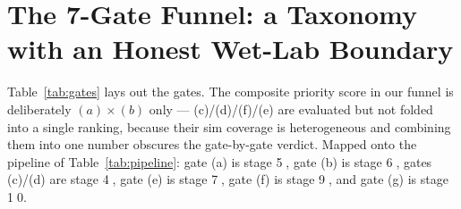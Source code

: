\documentclass[11pt,a4paper]{article}
\begin{document}
\section{The 7-Gate Funnel: a Taxonomy with an Honest Wet-Lab Boundary}
\label{sec:taxonomy}

Table~\ref{tab:gates} lays out the gates. The composite priority score
in our funnel is deliberately $(a)\!\times\!(b)$ only ---
(c)/(d)/(f)/(e) are evaluated but not folded into a single ranking,
because their sim coverage is heterogeneous and combining them into
one number obscures the gate-by-gate verdict. Mapped onto the pipeline
of Table~\ref{tab:pipeline}: gate (a) is stage \textcircled{\scriptsize 5},
gate (b) is stage \textcircled{\scriptsize 6}, gates (c)/(d) are stage
\textcircled{\scriptsize 4}, gate (e) is stage \textcircled{\scriptsize 7},
gate (f) is stage \textcircled{\scriptsize 9}, and gate (g) is stage
\textcircled{\scriptsize 10}.
\end{document}
